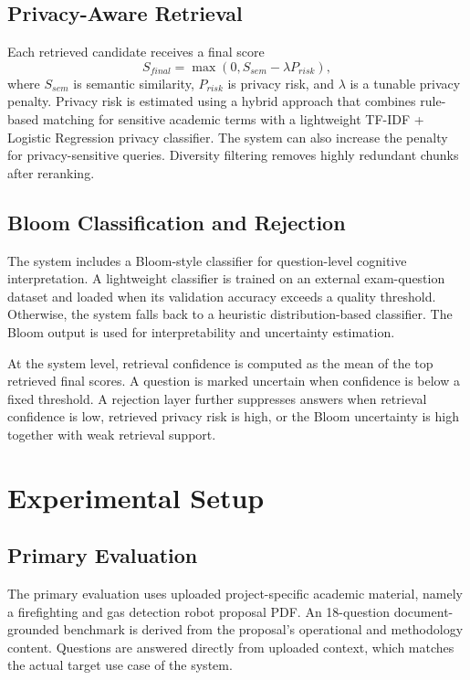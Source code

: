 \documentclass[conference]{IEEEtran}
\begin{document}
\subsection{Privacy-Aware Retrieval}
Each retrieved candidate receives a final score
\begin{equation}
S_{final} = \max(0, S_{sem} - \lambda P_{risk}),
\end{equation}
where $S_{sem}$ is semantic similarity, $P_{risk}$ is privacy risk, and $\lambda$ is a tunable privacy penalty. Privacy risk is estimated using a hybrid approach that combines rule-based matching for sensitive academic terms with a lightweight TF-IDF + Logistic Regression privacy classifier. The system can also increase the penalty for privacy-sensitive queries. Diversity filtering removes highly redundant chunks after reranking.

\subsection{Bloom Classification and Rejection}
The system includes a Bloom-style classifier for question-level cognitive interpretation. A lightweight classifier is trained on an external exam-question dataset and loaded when its validation accuracy exceeds a quality threshold. Otherwise, the system falls back to a heuristic distribution-based classifier. The Bloom output is used for interpretability and uncertainty estimation.

At the system level, retrieval confidence is computed as the mean of the top retrieved final scores. A question is marked uncertain when confidence is below a fixed threshold. A rejection layer further suppresses answers when retrieval confidence is low, retrieved privacy risk is high, or the Bloom uncertainty is high together with weak retrieval support.

\section{Experimental Setup}
\subsection{Primary Evaluation}
The primary evaluation uses uploaded project-specific academic material, namely a firefighting and gas detection robot proposal PDF. An 18-question document-grounded benchmark is derived from the proposal's operational and methodology content. Questions are answered directly from uploaded context, which matches the actual target use case of the system.
\end{document}
